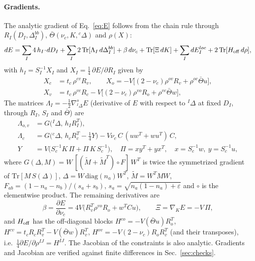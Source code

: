 \documentclass[11pt]{article}
\newcommand{\Tr}{\mathrm{Tr}}
\begin{document}
\paragraph{Gradients.} The analytic gradient of Eq.~\eqref{eq:E} follows from the chain rule through $R_I(D_I,\Delta^{bb}_I)$,
$\bar\Theta(\nu_c,K,{}^c\Delta)$ and $\rho(X)$:
\begin{equation}
dE=\sum_I4\,h_I\!\cdot\!dD_I+\sum_I2\,\Tr[\Lambda_I\,d\Delta^{bb}_I]+\beta\,d\nu_c+\Tr[\Xi\,dK]+\sum_IdE^{loc}_I
+2\,\Tr[H_{\rm off}\,d\rho] ,
\label{eq:dE}
\end{equation}
with $h_I=S_I^{-1}X_I$ and $X_I=\tfrac14\,\partial E/\partial R_I$ given by
\begin{equation}
\begin{aligned}
X_c&=t_c\,\rho^{cv}R_v,\qquad
X_o=-V\big[(2-\nu_c)\rho^{ov}R_v+\rho^{oc}\bar\Theta u\big],\\
X_v&=t_c\,\rho^{vc}R_c-V\big[(2-\nu_c)\rho^{vo}R_o+\rho^{vc}\bar\Theta w\big],
\end{aligned}
\end{equation}
The matrices $\Lambda_I=-\tfrac12\nabla^s_{{}^I\Delta}E$ (derivative of $E$ with respect to ${}^I\Delta$ at fixed
$D_I$, through $R_I$, $S_I$ and $\bar\Theta$) are
\begin{equation}
\begin{aligned}
\Lambda_{o,v}&=G\big({}^I\Delta,\,h_IR_I^T\big),\\
\Lambda_c&=G\big({}^c\Delta,\,h_cR_c^T-\tfrac14Y\big)-V\nu_c\,C\,(uw^T+wu^T)\,C,\\
Y&=V\big(S_c^{-1}K\,\Pi+\Pi\,K\,S_c^{-1}\big),\quad \Pi=xy^T+yx^T,\quad x=S_c^{-1}w,\ y=S_c^{-1}u,
\end{aligned}
\end{equation}
where $G(\Delta,M)=W\,[(\tilde M+\tilde M^T)\circ F]\,W^T$ is twice the symmetrized gradient of $\Tr[M\,S(\Delta)]$,
$\Delta=W\,\mathrm{diag}(n_a)W^T$, $\tilde M=W^TMW$, $F_{ab}=(1-n_a-n_b)/(s_a+s_b)$, $s_a=\sqrt{n_a(1-n_a)+\varepsilon}$
and $\circ$ is the elementwise product. The remaining derivatives are
\begin{equation}
\beta=\frac{\partial E}{\partial\nu_c}=4V\big(R_v^T\rho^{vo}R_o+w^TCu\big),\qquad\Xi=\nabla_KE=-V\,\Pi,
\end{equation}
and $H_{\rm off}$ has the off-diagonal blocks
$H^{co}=-V(\bar\Theta u)R_o^T$, $H^{cv}=t_cR_cR_v^T-V(\bar\Theta w)R_v^T$, $H^{ov}=-V(2-\nu_c)R_oR_v^T$
(and their transposes), i.e.\ $\tfrac14\partial E/\partial\rho^{IJ}=H^{IJ}$. The Jacobian of the constraints is also analytic.
Gradients and Jacobian are verified against finite differences in Sec.~\ref{sec:checks}.
\end{document}
